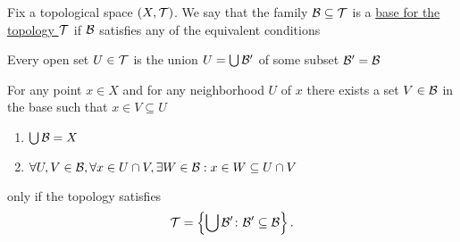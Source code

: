 \begin{definition}\label{def:topological_base}\cite[23]{Lectures:general_topology}
  Fix a topological space $(X, \mathcal T)$. We say that the family $\mathcal B \subseteq \mathcal T$ is a \uline{base for the topology $\mathcal T$} if $\mathcal B$ satisfies any of the equivalent conditions
  \begin{defenum}
    \item\label{def:topological_base/union} Every open set $U \in \mathcal T$ is the union $U = \bigcup \mathcal B'$ of some subset $\mathcal B' = \mathcal B$
    \item\label{def:topological_base/subset} For any point $x \in X$ and for any neighborhood $U$ of $x$ there exists a set $V \in \mathcal B$ in the base such that $x \in V \subseteq U$
    \item\label{def:topological_base/axioms}
    \begin{enumerate}[label={\textbf{B\arabic*)}}]
      \item\label{def:topological_base/B1} $\bigcup \mathcal B = X$
      \item\label{def:topological_base/B2} $\forall U, V \in \mathcal B, \forall x \in U \cap V, \exists W \in \mathcal B: x \in W \subseteq U \cap V$
    \end{enumerate}
    only if the topology satisfies
    \begin{equation}\label{def:topological_base/topology}
      \mathcal T = \left\{ \bigcup \mathcal B' \colon \mathcal B' \subseteq \mathcal B \right\}.
    \end{equation}
  \end{defenum}
\end{definition}
